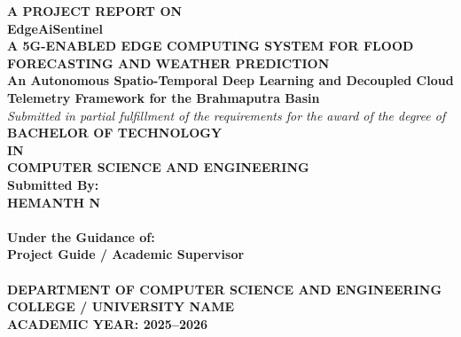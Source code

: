 \documentclass[12pt,a4paper,oneside]{report}
\begin{document}
\begin{titlepage}
\hypersetup{pageanchor=false}
\centering
\vspace*{0.5cm}

{\Large \textbf{A PROJECT REPORT ON}}\\[0.8cm]

{\LARGE\bfseries EdgeAiSentinel}\\[0.35cm]
{\large\bfseries A 5G-ENABLED EDGE COMPUTING SYSTEM FOR FLOOD FORECASTING AND WEATHER PREDICTION}\\[0.4cm]
{\normalsize\bfseries An Autonomous Spatio-Temporal Deep Learning and Decoupled Cloud Telemetry Framework for the Brahmaputra Basin}\\[0.8cm]

{\large \textit{Submitted in partial fulfillment of the requirements for the award of the degree of}}\\[0.6cm]

{\Large \textbf{BACHELOR OF TECHNOLOGY}}\\[0.3cm]
{\large \textbf{IN}}\\[0.3cm]
{\Large \textbf{COMPUTER SCIENCE AND ENGINEERING}}\\[1.2cm]

\textbf{Submitted By:}\\[0.2cm]
{\large \textbf{HEMANTH N}}\\[0.2cm]
\\[1.2cm]

\textbf{Under the Guidance of:}\\[0.2cm]
{\large \textbf{Project Guide / Academic Supervisor}}\\[0.2cm]
\\[1.5cm]

\vfill
{\large \textbf{DEPARTMENT OF COMPUTER SCIENCE AND ENGINEERING}}\\[0.2cm]
{\large \textbf{COLLEGE / UNIVERSITY NAME}}\\[0.2cm]
{\large \textbf{ACADEMIC YEAR: 2025--2026}}

\end{titlepage}
\hypersetup{pageanchor=true}
\end{document}
